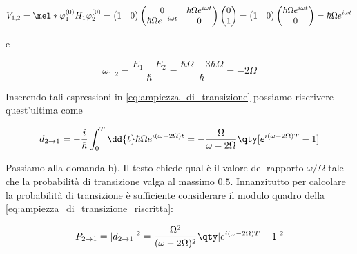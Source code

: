 \begin{soluzione}
   \begin{equation*}
      V_{1,2}
      =\mel*{\varphi_1^{(0)}}{H_1}{\varphi_2^{(0)}}
      =
      \begin{pmatrix}
         1 & 0
      \end{pmatrix}
      \begin{pmatrix}
         0 & \hbar \Omega e^{i\omega t}\\
         \hbar \Omega e^{-i\omega t} & 0\\
      \end{pmatrix}
      \begin{pmatrix}
         0\\
         1
      \end{pmatrix}
      =
      \begin{pmatrix}
         1 & 0
      \end{pmatrix}
      \begin{pmatrix}
         \hbar \Omega e^{i\omega t}\\
         0
      \end{pmatrix}
      =\hbar \Omega e^{i \omega t}
   \end{equation*}
   
   e

   \begin{equation*}
      \omega_{1,2}
      =\frac{E_1 - E_2}{\hbar}
      =\frac{\hbar \Omega - 3\hbar \Omega}{\hbar}
      =-2\Omega
   \end{equation*}

   Inserendo tali espressioni in \eqref{eq:ampiezza_di_transizione} possiamo riscrivere quest'ultima come

   \begin{equation}
      d_{2 \to 1}
      =-\frac{i}{\hbar} \int_{0}^{T} \dd{t} \hbar \Omega e^{i( \omega - 2\Omega ) t}
      =-\frac{\Omega}{\omega - 2\Omega} \qty[ e^{i(\omega - 2\Omega)T} - 1 ]
      \label{eq:ampiezza_di_transizione_riscritta}
   \end{equation}

   Passiamo alla domanda b). Il testo chiede qual è il valore del rapporto $\omega/\Omega$ tale che la probabilità di transizione valga al massimo $0.5$. Innanzitutto per calcolare la probabilità di transizione è sufficiente considerare il modulo quadro della \eqref{eq:ampiezza_di_transizione_riscritta}:

   \begin{equation*}
      P_{2 \to 1}
      =| d_{2 \to 1} |^2
      =\frac{\Omega^2}{(\omega - 2\Omega)^2} \qty| e^{i(\omega - 2\Omega)T} - 1 |^2
   \end{equation*}
   

\end{soluzione}
